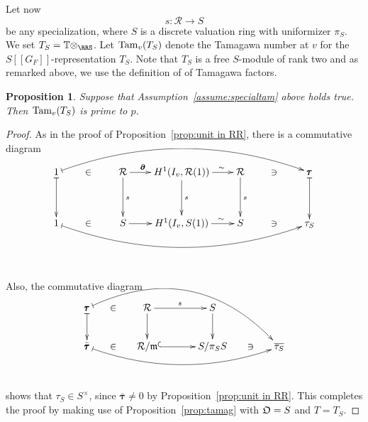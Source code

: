 \documentclass[12pt]{amsart}
\numberwithin{equation}{section}
\newtheorem{prop}[thm]{Proposition}
\begin{document}
Let now
$$s: {\mathcal{R}} {\longrightarrow} S$$
 be any specialization, where $S$ is a discrete valuation ring with uniformizer $\pi_S$. We set $T_S={\mathbb{T}}\otimes_\RRS$. Let $\textup{Tam}_v(T_S)$ denote the Tamagawa number at $v$ for the $S[[G_F]]$-representation $T_S$. Note that $T_S$ is a free $S$-module of rank two and as remarked above, we use the definition of \cite{FPR91} of Tamagawa factors.
\begin{prop}
\label{prop:tamuniformity}
 Suppose that Assumption~\ref{assume:specialtam} above holds true. Then $\textup{Tam}_v(T_S)$ is prime to $p$.
\end{prop}
\begin{proof}
As in the proof of Proposition~\ref{prop:unit in RR}, there is a commutative diagram\\
 $$ \xymatrix@C=.29in@R=.2in{1 \ar @{|->}[dd] \ar @/^2pc/@{|->}[rrrrrr]&**[l]\in&{\mathcal{R}} \ar[dd]^{s}\ar[r]^(.34){\pmb{\partial}}& H^1(I_v,{\mathcal{R}}(1)) \ar[dd]^{s} \ar[r]^(.68){\sim}&{\mathcal{R}}\ar[dd]^{s}&**[l] \ni&\pmb{\tau} \ar @{|->}[dd]\\
&&&&&&\\
1\ar @/_2pc/@{|->}[rrrrrr]&**[l]\in&S\ar[r] & H^1(I_v,S(1))\ar[r]^(.67){\sim}&S&**[l] \ni &\tau_S
 }$$
 \\\\\\
 Also, the commutative diagram\\
 $$\xymatrix@C=.2in{ \pmb{\tau}\ar @/^3.1pc/@{|->}[drrrrrr] \ar@{|->}[d]& \in & {\mathcal{R}}\ar[rr]^{s}\ar[d]&&S\ar[d]&&\\
 \bar{\pmb{\tau}}\ar @/_1.5pc/@{|->}[rrrrrr]&\in&{\mathcal{R}}/\frak{m}\ar@{^{(}->}[rr]&&S/\pi_SS&\ni&\overline{\tau_S}
 }$$\\\\
 shows that $\tau_S \in S^\times$, since $\bar{\pmb{\tau}}\neq 0$ by Proposition~\ref{prop:unit in RR}. This completes the proof by making use of Proposition~\ref{prop:tamag} with $\frak{O}=S$ and $T=T_S$.
\end{proof}
\end{document}
